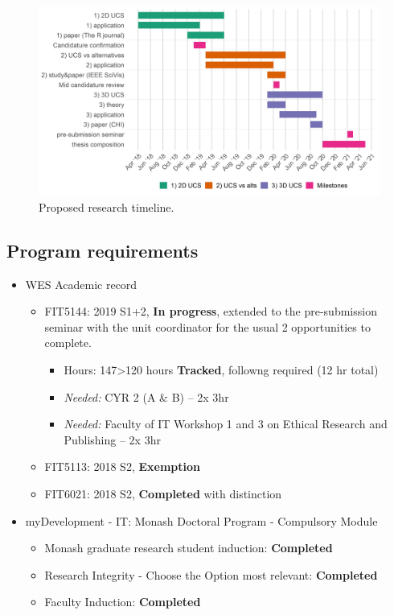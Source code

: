\documentclass[11,]{article}
\providecommand{\tightlist}{%
  \setlength{\itemsep}{0pt}\setlength{\parskip}{0pt}}
\begin{document}
\begin{figure}

{\centering \includegraphics[width=1\linewidth]{figures/phd_timeline} 

}

\caption{Proposed research timeline.}\label{fig:timeline}
\end{figure}

\hypertarget{program-requirements}{%
\subsection{Program requirements}\label{program-requirements}}

\begin{itemize}
\tightlist
\item
  WES Academic record

  \begin{itemize}
  \tightlist
  \item
    FIT5144: 2019 S1+2, \textbf{In progress}, extended to the pre-submission seminar with the unit coordinator for the usual 2 opportunities to complete.

    \begin{itemize}
    \tightlist
    \item
      Hours: 147\textgreater120 hours \textbf{Tracked}, followng required (12 hr total)
    \item
      \emph{Needed:} CYR 2 (A \& B) -- 2x 3hr
    \item
      \emph{Needed:} Faculty of IT Workshop 1 and 3 on Ethical Research and Publishing -- 2x 3hr
    \end{itemize}
  \item
    FIT5113: 2018 S2, \textbf{Exemption}
  \item
    FIT6021: 2018 S2, \textbf{Completed} with distinction
  \end{itemize}
\item
  myDevelopment - IT: Monash Doctoral Program - Compulsory Module

  \begin{itemize}
  \tightlist
  \item
    Monash graduate research student induction: \textbf{Completed}
  \item
    Research Integrity - Choose the Option most relevant: \textbf{Completed}
  \item
    Faculty Induction: \textbf{Completed}
  \end{itemize}
\end{itemize}
\end{document}
